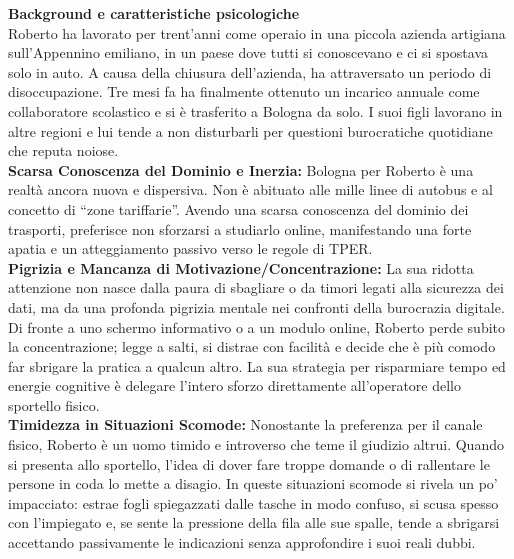 ﻿\documentclass[11pt,a4paper]{article}
\begin{document}
\begin{tcolorbox}[base]
    \textbf{Background e caratteristiche psicologiche} \\[4pt]
    {\small
    Roberto ha lavorato per trent'anni come operaio in una piccola azienda artigiana sull'Appennino emiliano, in un paese dove tutti si conoscevano e ci si spostava solo in auto. A causa della chiusura dell'azienda, ha attraversato un periodo di disoccupazione. Tre mesi fa ha finalmente ottenuto un incarico annuale come collaboratore scolastico e si è trasferito a Bologna da solo. I suoi figli lavorano in altre regioni e lui tende a non disturbarli per questioni burocratiche quotidiane che reputa noiose. \\[4pt]

    \textbf{Scarsa Conoscenza del Dominio e Inerzia:} Bologna per Roberto è una realtà ancora nuova e dispersiva. Non è abituato alle mille linee di autobus e al concetto di ``zone tariffarie''. Avendo una scarsa conoscenza del dominio dei trasporti, preferisce non sforzarsi a studiarlo online, manifestando una forte apatia e un atteggiamento passivo verso le regole di TPER. \\[4pt]

    \textbf{Pigrizia e Mancanza di Motivazione/Concentrazione:} La sua ridotta attenzione non nasce dalla paura di sbagliare o da timori legati alla sicurezza dei dati, ma da una profonda pigrizia mentale nei confronti della burocrazia digitale. Di fronte a uno schermo informativo o a un modulo online, Roberto perde subito la concentrazione; legge a salti, si distrae con facilità e decide che è più comodo far sbrigare la pratica a qualcun altro. La sua strategia per risparmiare tempo ed energie cognitive è delegare l'intero sforzo direttamente all'operatore dello sportello fisico. \\[4pt]

    \textbf{Timidezza in Situazioni Scomode:} Nonostante la preferenza per il canale fisico, Roberto è un uomo timido e introverso che teme il giudizio altrui. Quando si presenta allo sportello, l'idea di dover fare troppe domande o di rallentare le persone in coda lo mette a disagio. In queste situazioni scomode si rivela un po' impacciato: estrae fogli spiegazzati dalle tasche in modo confuso, si scusa spesso con l'impiegato e, se sente la pressione della fila alle sue spalle, tende a sbrigarsi accettando passivamente le indicazioni senza approfondire i suoi reali dubbi.
    }
\end{tcolorbox}
\end{document}
